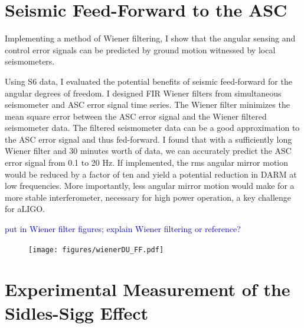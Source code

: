 \section{Seismic Feed-Forward to the ASC}
Implementing a method of Wiener ﬁltering, I show that the angular
sensing and control error signals can be predicted by ground motion
witnessed by local seismometers.

Using S6 data, I evaluated the potential benefits of seismic
feed-forward for the angular degrees of freedom. I designed FIR Wiener
filters from simultaneous seismometer and ASC error signal time
series. The Wiener filter minimizes the mean square error between the
ASC error signal and the Wiener filtered seismometer data. The
filtered seismometer data can be a good approximation to the ASC error
signal and thus fed-forward. I found that with a sufficiently long
Wiener filter and 30 minutes worth of data, we can accurately predict
the ASC error signal from 0.1 to 20 Hz. If implemented, the rms
angular mirror motion would be reduced by a factor of ten and yield a
potential reduction in DARM at low frequencies. More importantly, less
angular mirror motion would make for a more stable interferometer,
necessary for high power operation, a key challenge for aLIGO.

\textcolor{blue}{put in Wiener filter figures; explain Wiener
  filtering or reference?}


\begin{figure}
\begin{centering}
\texttt{[image: figures/wienerDU\_FF.pdf]}
\caption[]{}
\label{fig:wienerFF}
\end{centering}
\end{figure}







\section{Experimental Measurement of the Sidles-Sigg Effect}
\label{sec:siggsidles_measured}

